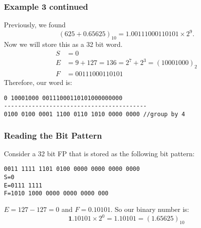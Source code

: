 \begin{frame}[fragile]\frametitle{Example 3 continued}
Previously, we found
$$(625+0.65625)_{10}= 1.00111000110101\times 2^9.$$
Now we will store this as a 32 bit word.
\begin{align*}
S&=0\\
E&=9 + 127 = 136 = 2^7+2^3 = (1000 1000)_2\\
F&=00111000110101
\end{align*}
Therefore, our word is:
\begin{verbatim}
0 10001000 00111000110101000000000
-----------------------------------------
0100 0100 0001 1100 0110 1010 0000 0000 //group by 4
\end{verbatim}
\end{frame}
\begin{frame}[fragile]\frametitle{Reading the Bit Pattern}
Consider a 32 bit FP that is stored as the following bit pattern:
\begin{verbatim}
0011 1111 1101 0100 0000 0000 0000 0000
S=0
E=0111 1111
F=1010 1000 0000 0000 0000 000
\end{verbatim}
$E = 127 - 127 =0$ and $F=0.10101$. So our binary number is:
$$\textbf{1}.10101 \times 2^0 = 1.10101 = (1.65625)_{10}$$

\end{frame}

